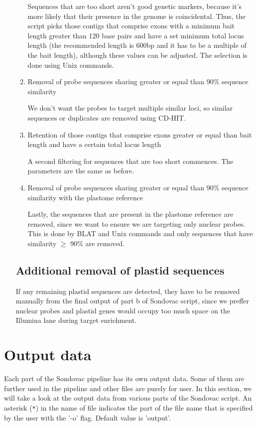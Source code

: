 \begin{enumerate}
\begin{enumerate}
Sequences that are too short aren't good genetic markers, because it's more likely that their presence in the genome is coincidental. Thus, the script picks those contigs that 
comprise exons with a minimum bait length greater than 120 base pairs and have a set minimum total locus length (the recommended length is 600bp and it has to be a multiple of 
the bait length), although these values can be adjusted. The selection is done using Unix commands. 

\item Removal of probe sequences sharing greater or equal than 90\% sequence similarity

We don't want the probes to target multiple similar loci, so similar sequences or duplicates are removed using CD-HIT. 

\item Retention of those contigs that comprise exons greater or equal than bait length and have a certain total locus length

A second filtering for sequences that are too short commences. The parameters are the same as before. 

\item Removal of probe sequences sharing greater or equal than 90\% sequence similarity with the plastome reference

Lastly, the sequences that are present in the plastome reference are removed, since we want to ensure we are targeting only nuclear probes. This is done by BLAT and Unix commands and 
only sequences that have similarity $\geq$ 90\% are removed. 

\end{enumerate}

\subsection{Additional removal of plastid sequences}

If any remaining plastid sequences are detected, they have to be removed manually from the final output of part b of Sondovac script, since we preffer nuclear probes and 
plastid genes would occupy too much space on the Illumina lane during target enrichment. 

\end{enumerate}

\section{Output data}
Each part of the Sondovac pipeline has its own output data. Some of them are further used in the pipeline and other files are purely for user. In this section, we will 
take a look at the output data from various parts of the Sondovac script. 
An asterisk (\verb_*_) in the name of file indicates the part of the file name that is specified by the user with the '-o' flag. Default value is 'output'. 

